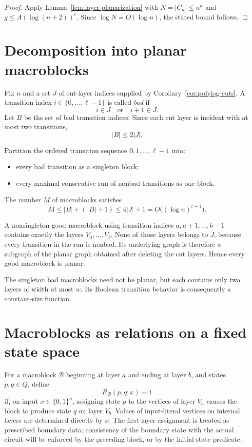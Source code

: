 \documentclass[11pt]{article}
\theoremstyle{definition}
\newcommand{\bits}{\{0,1\}}
\newcommand{\cB}{\mathcal{B}}
\begin{document}
\begin{proof}
Apply Lemma~\ref{lem:layer-planarization} with $N=|C_n|\le n^k$ and $g\le A(\log(n+2))^c$. Since $\log N=O(\log n)$, the stated bound follows.
\end{proof}

\section{Decomposition into planar macroblocks}

Fix $n$ and a set $J$ of cut-layer indices supplied by Corollary~\ref{cor:polylog-cuts}. A transition index $i\in\{0,\ldots,\ell-1\}$ is called \emph{bad} if
\[
  i\in J\quad\text{or}\quad i+1\in J.
\]
Let $B$ be the set of bad transition indices. Since each cut layer is incident with at most two transitions,
\[
  |B|\le 2|J|.
\]

Partition the ordered transition sequence $0,1,\ldots,\ell-1$ into:
\begin{itemize}
\item every bad transition as a singleton block;
\item every maximal consecutive run of nonbad transitions as one block.
\end{itemize}
The number $M$ of macroblocks satisfies
\[
  M\le |B|+(|B|+1)\le 4|J|+1
   =O\bigl((\log n)^{c+1}\bigr).
\]

A nonsingleton good macroblock using transition indices $a,a+1,\ldots,b-1$ contains exactly the layers $V_a,\ldots,V_b$. None of those layers belongs to $J$, because every transition in the run is nonbad. Its underlying graph is therefore a subgraph of the planar graph obtained after deleting the cut layers. Hence every good macroblock is planar.

The singleton bad macroblocks need not be planar, but each contains only two layers of width at most $w$. Its Boolean transition behavior is consequently a constant-size function.

\section{Macroblocks as relations on a fixed state space}

For a macroblock $\cB$ beginning at layer $a$ and ending at layer $b$, and states $p,q\in Q$, define
\[
  R_{\cB}(p,q;x)=1
\]
if, on input $x\in\bits^n$, assigning state $p$ to the vertices of layer $V_a$ causes the block to produce state $q$ on layer $V_b$. Values of input-literal vertices on internal layers are determined directly by $x$. The first-layer assignment is treated as prescribed boundary data; consistency of the boundary state with the actual circuit will be enforced by the preceding block, or by the initial-state predicate.
\end{document}
